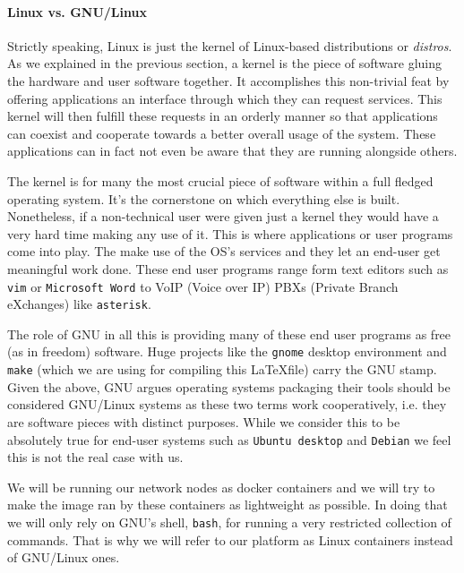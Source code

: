             \paragraph{Linux vs. GNU/Linux}
                Strictly speaking, Linux is just the kernel of Linux-based distributions or \textit{distros}. As we explained in the previous section, a kernel is the piece of software gluing the hardware and user software together. It accomplishes this non-trivial feat by offering applications an interface through which they can request services. This kernel will then fulfill these requests in an orderly manner so that applications can coexist and cooperate towards a better overall usage of the system. These applications can in fact not even be aware that they are running alongside others.

                The kernel is for many the most crucial piece of software within a full fledged operating system. It's the cornerstone on which everything else is built. Nonetheless, if a non-technical user were given just a kernel they would have a very hard time making any use of it. This is where applications or user programs come into play. The make use of the OS's services and they let an end-user get meaningful work done. These end user programs range form text editors such as \texttt{vim} or \texttt{Microsoft Word} to VoIP (Voice over IP) PBXs (Private Branch eXchanges) like \texttt{asterisk}.

                The role of GNU in all this is providing many of these end user programs as free (as in freedom) software. Huge projects like the \texttt{gnome} desktop environment and \texttt{make} (which we are using for compiling this \LaTeX file) carry the GNU stamp. Given the above, GNU argues operating systems packaging their tools should be considered GNU/Linux systems as these two terms work cooperatively, i.e. they are software pieces with distinct purposes. While we consider this to be absolutely true for end-user systems such as \texttt{Ubuntu desktop} and \texttt{Debian} we feel this is not the real case with us.

                We will be running our network nodes as docker containers and we will try to make the image ran by these containers as lightweight as possible. In doing that we will only rely on GNU's shell, \texttt{bash}, for running a very restricted collection of commands. That is why we will refer to our platform as Linux containers instead of GNU/Linux ones.

